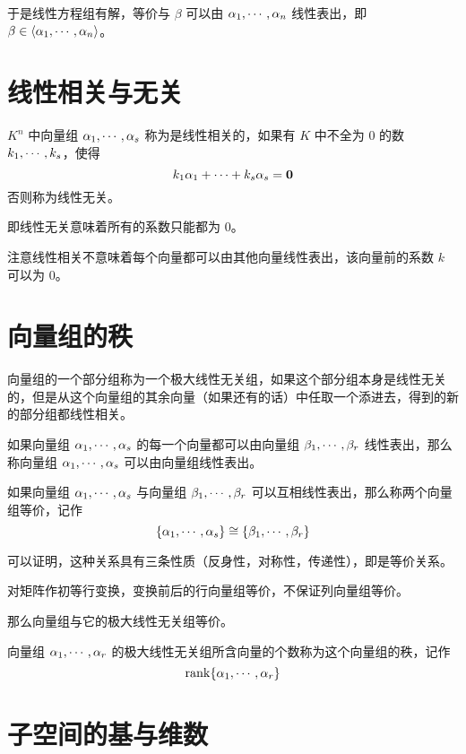 于是线性方程组有解，等价与 $\beta$ 可以由 $\alpha_1,\cdots,\alpha_n$ 线性表出，即 $\beta \in \langle\alpha_1,\cdots,\alpha_n\rangle$。

\section{线性相关与无关}

\begin{definition}
	$K^n$ 中向量组 $\alpha_1,\cdots,\alpha_s$ 称为是线性相关的，如果有 $K$ 中不全为 $0$ 的数 $k_1,\cdots,k_s$，使得
	\[k_1\alpha_1+\cdots+k_s\alpha_s=\boldsymbol{0}\]
	否则称为线性无关。
\end{definition}

即线性无关意味着所有的系数只能都为 $0$。

注意线性相关不意味着每个向量都可以由其他向量线性表出，该向量前的系数 $k$ 可以为 $0$。

\section{向量组的秩}

\begin{definition}[极大线性无关组]
	向量组的一个部分组称为一个极大线性无关组，如果这个部分组本身是线性无关的，但是从这个向量组的其余向量（如果还有的话）中任取一个添进去，得到的新的部分组都线性相关。
\end{definition}

如果向量组 $\alpha_1,\cdots,\alpha_s$ 的每一个向量都可以由向量组 $\beta_1,\cdots,\beta_r$ 线性表出，那么称向量组 $\alpha_1,\cdots,\alpha_s$ 可以由向量组线性表出。

\begin{definition}
	如果向量组 $\alpha_1,\cdots,\alpha_s$ 与向量组 $\beta_1,\cdots,\beta_r$ 可以互相线性表出，那么称两个向量组等价，记作
	\[\{\alpha_1,\cdots,\alpha_s\} \cong \{\beta_1,\cdots,\beta_r\}\]
\end{definition}

可以证明，这种关系具有三条性质（反身性，对称性，传递性），即是等价关系。

对矩阵作初等行变换，变换前后的行向量组等价，不保证列向量组等价。

那么向量组与它的极大线性无关组等价。

\begin{definition}
	向量组 $\alpha_1,\cdots,\alpha_r$ 的极大线性无关组所含向量的个数称为这个向量组的秩，记作
	\[\operatorname{rank}\{\alpha_1,\cdots,\alpha_r\}\]
\end{definition}

\section{子空间的基与维数}

